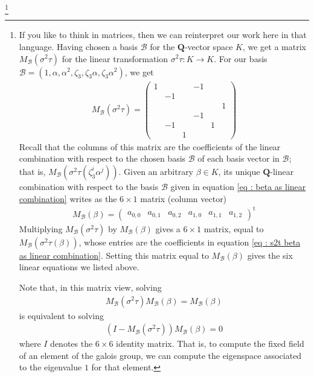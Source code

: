 \documentclass[oneside, english, 11pt]{article}
\newcommand{\fontField}[1]{\mathbf{#1}}
\newcommand{\Q}{\rationals}
\newcommand{\rationals}{\fontField{Q}}
\newcommand{\transpose}{^\mathrm{t}}
\begin{document}
\footnote{If you like to think in matrices, then we can reinterpret our work here in that language. Having chosen a basis $\mathcal{B}$ for the $\Q$-vector space $K$, we get a matrix $M_{\mathcal{B}}(\sigma^{2} \tau)$ for the linear transformation $\sigma^{2} \tau : K \rightarrow K$. For our basis $\mathcal{B} = (1, \alpha, \alpha^{2}, \zeta_{3}, \zeta_{3} \alpha, \zeta_{3} \alpha^{2})$, we get
\begin{align*}
M_{\mathcal{B}}(\sigma^{2} \tau)
=
\begin{pmatrix}
1	&		&		&	-1	&		&		\\
	&	-1	&		&		&		&		\\
	&		&		&		&		&	1	\\
	&		&		&	-1	&		&		\\
	&	-1	&		&		&	1	&		\\
	&		&	1	&		&		&	
\end{pmatrix}
\end{align*}
Recall that the columns of this matrix are the coefficients of the linear combination with respect to the chosen basis $\mathcal{B}$ of each basis vector in $\mathcal{B}$; that is, $M_{\mathcal{B}}(\sigma^{2} \tau(\zeta_{3}^{i} \alpha^{j}))$. Given an arbitrary $\beta \in K$, its unique $\Q$-linear combination with respect to the basis $\mathcal{B}$ given in equation \eqref{eq : beta as linear combination} writes as the $6 \times 1$ matrix (column vector)
\begin{align*}
M_{\mathcal{B}}(\beta)
=
\begin{pmatrix}
a_{0, 0}	&	a_{0, 1}	&	a_{0, 2}	&	a_{1, 0}	&	a_{1, 1}	&	a_{1, 2}
\end{pmatrix}%
\transpose
\end{align*}
Multiplying $M_{\mathcal{B}}(\sigma^{2} \tau)$ by $M_{\mathcal{B}}(\beta)$ gives a $6 \times 1$ matrix, equal to $M_{\mathcal{B}}(\sigma^{2} \tau(\beta))$, whose entries are the coefficients in equation \eqref{eq : s2t beta as linear combination}. Setting this matrix equal to $M_{\mathcal{B}}(\beta)$ gives the six linear equations we listed above.

Note that, in this matrix view, solving
\begin{align*}
M_{\mathcal{B}}(\sigma^{2} \tau) M_{\mathcal{B}}(\beta)
=
M_{\mathcal{B}}(\beta)
\end{align*}
is equivalent to solving
\begin{align*}
(I - M_{\mathcal{B}}(\sigma^{2} \tau)) M_{\mathcal{B}}(\beta)
=
0
\end{align*}
where $I$ denotes the $6 \times 6$ identity matrix. That is, to compute the fixed field of an element of the galois group, we can compute the eigenspace associated to the eigenvalue $1$ for that element.}%
\end{document}
